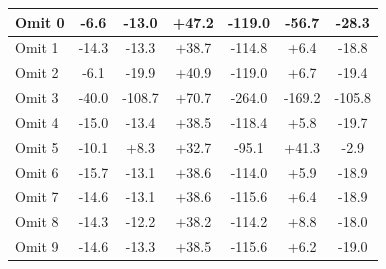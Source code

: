 \begin{table}[!h]
\begin{center}
\begin{tabular}[h]{|l||c|c|c|c|c||c|}
Omit 0& -6.6& -13.0& +47.2& -119.0& -56.7& -28.3\\\hline
Omit 1& -14.3& -13.3& +38.7& -114.8& +6.4& -18.8\\\hline
Omit 2& -6.1& -19.9& +40.9& -119.0& +6.7& -19.4\\\hline
{\color{Gray}Omit 3}&{\color{Gray} -40.0}&{\color{Gray} -108.7}&{\color{Gray} +70.7}&{\color{Gray} -264.0}&{\color{Gray} -169.2}&{\color{Gray} -105.8}\\\hline
Omit 4& -15.0& -13.4& +38.5& -118.4& +5.8& -19.7\\\hline
Omit 5& -10.1& +8.3& +32.7& -95.1& +41.3& -2.9\\\hline
Omit 6& -15.7& -13.1& +38.6& -114.0& +5.9& -18.9\\\hline
Omit 7& -14.6& -13.1& +38.6& -115.6& +6.4& -18.9\\\hline
Omit 8& -14.3& -12.2& +38.2& -114.2& +8.8& -18.0\\\hline
Omit 9& -14.6& -13.3& +38.5& -115.6& +6.2& -19.0\\\hline
\end{tabular}
\end{center}
\label{tab:run1_ihwp_only_null_corrections_table}
\end{table}

